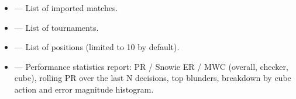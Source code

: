 \documentclass[letterpaper,10pt,english]{sphinxmanual}
\begin{document}
\sphinxAtStartPar
{}
\begin{itemize}
\item {} 
\sphinxAtStartPar
{} — List of imported matches.

\item {} 
\sphinxAtStartPar
{} — List of tournaments.

\item {} 
\sphinxAtStartPar
{} — List of positions (limited to 10 by default).

\item {} 
\sphinxAtStartPar
{} — Performance statistics report: PR / Snowie ER / MWC (overall, checker, cube), rolling PR over the last N decisions, top blunders, breakdown by cube action and error magnitude histogram.

\end{itemize}
\end{document}
